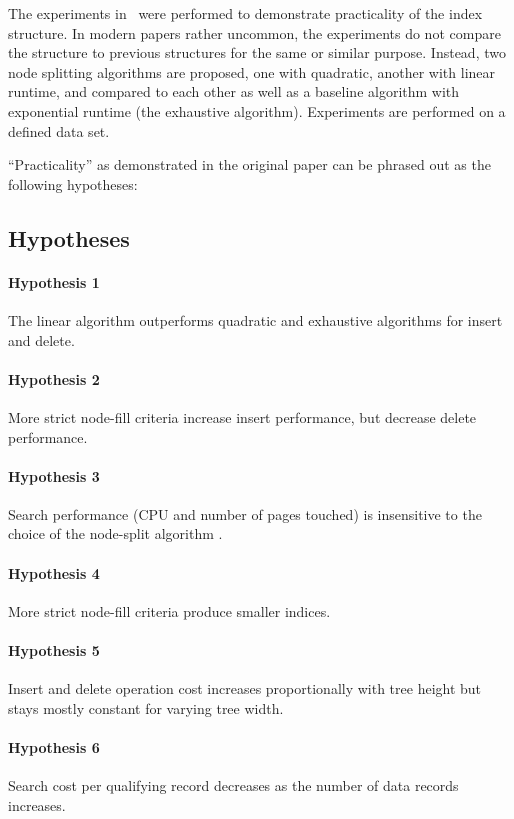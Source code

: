 The experiments in~\cite{DBLP:conf/sigmod/Guttman84} were performed to demonstrate practicality of 
the index structure. In modern papers rather uncommon, the experiments do not compare the structure to 
previous structures for the same or similar purpose. Instead, two node splitting algorithms are proposed, 
one with quadratic, another with linear runtime, and compared to each other as well as a baseline 
algorithm with exponential runtime (the exhaustive algorithm). Experiments are performed on a defined data set. 

``Practicality'' as demonstrated in the original paper can be phrased out as the following hypotheses: 
\subsection{Hypotheses}
\paragraph{Hypothesis 1}
The linear algorithm outperforms quadratic and exhaustive algorithms for insert and delete.

\paragraph{Hypothesis 2}
More strict node-fill criteria increase insert performance, but decrease delete performance.

\paragraph{Hypothesis 3}
Search performance (CPU and number of pages touched) is insensitive to the choice of the node-split algorithm .

\paragraph{Hypothesis 4}
More strict node-fill criteria produce smaller indices.

\paragraph{Hypothesis 5}
Insert and delete operation cost increases proportionally with tree height but stays mostly constant for varying tree width.

\paragraph{Hypothesis 6}
Search cost per qualifying record decreases as the number of data records increases.

